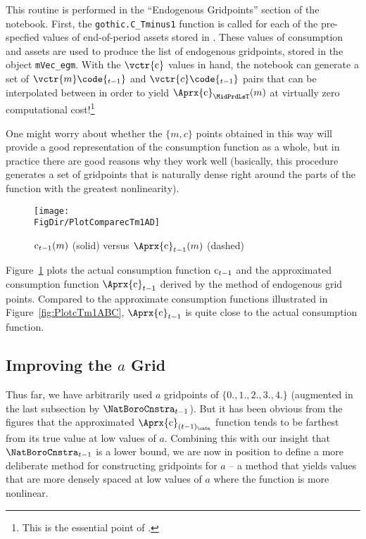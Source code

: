 \documentclass[titlepage, headings=optiontotocandhead]{Resources/texmf-local/tex/latex/econtex}
\begin{document}
This routine is performed in the ``Endogenous Gridpoints'' section of the notebook. First, the \texttt{gothic.C\_Tminus1} function is called for each of the pre-specfied values of end-of-period assets stored in . These values of consumption and assets are used to produce the list of endogenous gridpoints, stored in the object \texttt{mVec\_egm}. With the $\vctr{\cFunc}$ values in hand, the notebook can generate a set of $\vctr{m}\code{_{t-1}}$ and ${\vctr{c}\code{_{t-1}}}$ pairs that can be interpolated between in order to yield $\Aprx{\cFunc}_{\MidPrdLsT}(m)$ at virtually zero computational cost!\footnote{This is the essential point of \cite{carrollEGM}.} %

\hypertarget{PlotComparecTm1AD}{}
One might worry about whether the $\{{m},c\}$ points obtained in this way will provide a good representation of the consumption function as a whole, but in practice there are good reasons why they work well (basically, this procedure generates a set of gridpoints that is naturally dense right around the parts of the function with the greatest nonlinearity).
\begin{figure}
  \centerline{\texttt{[image: \\FigDir/PlotComparecTm1AD]}}
  \caption{$\mathrm{c}_{t-1}(m)$ (solid) versus $\Aprx{\cFunc}_{t-1}(m)$ (dashed)}
  \label{fig:ComparecTm1AD}
\end{figure}
Figure~\ref{fig:ComparecTm1AD} plots the actual consumption function $\mathrm{c}_{t-1}$ and the approximated consumption function $\Aprx{\cFunc}_{t-1}$ derived by the method of endogenous grid points. Compared to the approximate consumption functions illustrated in Figure~\ref{fig:PlotcTm1ABC}, $\Aprx{\cFunc}_{t-1}$ is quite close to the actual consumption function.



\hypertarget{improving-the-a-grid}{}
\subsection{Improving the $a$ Grid}\label{subsec:improving-the-a-grid}

Thus far, we have arbitrarily used $a$ gridpoints of $\{0.,1.,2.,3.,4.\}$ (augmented in the last subsection by $\NatBoroCnstra_{t-1}$).  But it has been obvious from the figures that the approximated $\Aprx{\cFunc}_{(t-1)_\cntn}$ function tends to be farthest from its true value at low values of $a$.  Combining this with our insight that $\NatBoroCnstra_{t-1}$ is a lower bound, we are now in position to define a more deliberate method for constructing gridpoints for $a$ -- a method that yields values that are more densely spaced at low values of $a$ where the function is more nonlinear.
\end{document}
